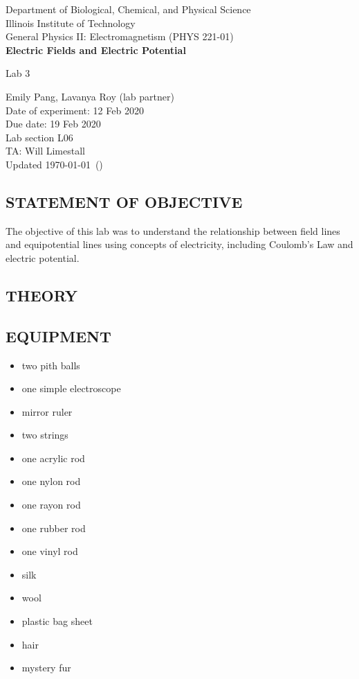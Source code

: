 \documentclass [12pt, letterpaper, twoside] {article}
\begin{document}
\begin {titlepage}
\begin {center}
Department of Biological, Chemical, and Physical Science\\
\vspace {0.1cm}
Illinois Institute of Technology\\
\vspace {0.1cm}
General Physics II: Electromagnetism (PHYS 221-01)\\
\vspace* {\fill}
\begingroup
\Large
\textbf {Electric Fields and Electric Potential}
\vspace {0.35cm}

\normalsize
Lab 3
\vspace {1.5cm}
\endgroup
\vspace* {\fill}
\end {center}

\vspace*{\fill}
\begin {flushright}
\footnotesize
Emily Pang, Lavanya Roy (lab partner) \\
Date of experiment: 12 Feb 2020 \\
Due date: 19 Feb 2020 \\
Lab section L06 \\
TA: Will Limestall \\
Updated \usdate\today~(\currenttime)
\end {flushright}
\end {titlepage}
\subsection* {STATEMENT OF OBJECTIVE}
The objective of this lab was to understand the relationship between field lines and equipotential lines using concepts of electricity, including Coulomb's Law and electric potential. \\

\subsection* {THEORY}


\subsection* {EQUIPMENT}
  \noindent
  \begin {itemize}
    \itemsep0em
    \item {two pith balls}
    \item {one simple electroscope}
    \item {mirror ruler}
    \item {two strings}
    \item {one acrylic rod}
    \item {one nylon rod}
    \item {one rayon rod}
    \item {one rubber rod}
    \item {one vinyl rod}
    \item {silk}
    \item {wool}
    \item {plastic bag sheet}
    \item {hair}
    \item {mystery fur}
  \end {itemize}
\end{document}
